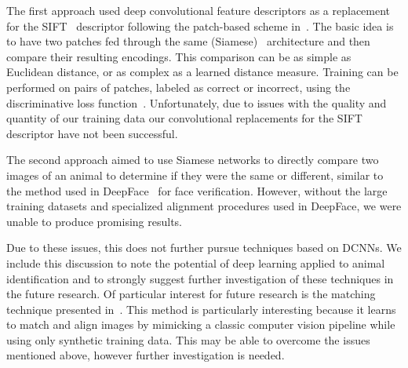         The first approach used deep convolutional feature descriptors as a replacement for the
        SIFT~\cite{lowe_distinctive_2004} descriptor following the patch-based scheme
        in~\cite{zagoruyko_learning_2015}. The basic idea is to have two patches fed through the same
        (Siamese)~\cite{chopra_learning_2005} architecture and then compare their resulting encodings. This
        comparison can be as simple as Euclidean distance, or as complex as a learned distance measure. Training
        can be performed on pairs of patches, labeled as correct or incorrect, using the discriminative loss
        function~\cite{lecun_loss_2005}. Unfortunately, due to issues with the quality and quantity of our training
        data our convolutional replacements for the SIFT descriptor have not been successful.

        The second approach aimed to use Siamese networks to directly compare two images of an animal to
          determine if they were the same or different, similar to the method used in
          DeepFace~\cite{taigman_deepface_2014} for face verification.
        However, without the large training datasets and specialized alignment procedures used in DeepFace, we
          were unable to produce promising results.
        
        Due to these issues, this \thesis{} does not further pursue techniques based on DCNNs.
        We include this discussion to note the potential of deep learning applied to animal identification and to
          strongly suggest further investigation of these techniques in the future research.
        Of particular interest for future research is the matching technique presented
          in~\cite{rocco_convolutional_2017}.
        This method is particularly interesting because it learns to match and align images by mimicking a
          classic computer vision pipeline while using only synthetic training data.
        This may be able to overcome the issues mentioned above,
        however further investigation is needed.
